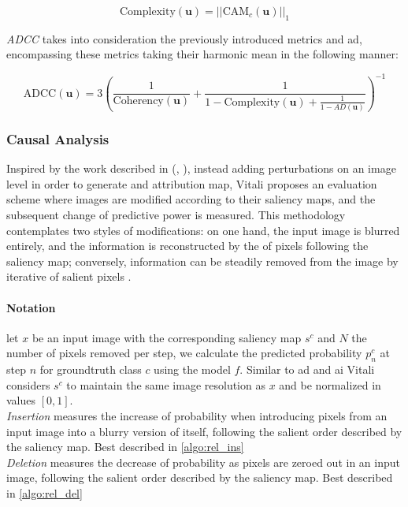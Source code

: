 \begin{equation}
	\mbox{Complexity}(\mathbf{u}) = ||\mbox{CAM}_c(\mathbf{u})||_1
\end{equation}

\noindent \emph{ADCC} takes into consideration the previously introduced metrics and 
\gls{ad}, encompassing these metrics taking their harmonic mean in the following manner:

\begin{equation}
	\mbox{ADCC}(\mathbf{u}) = 3\left(\frac{1}{\mbox{Coherency}(\mathbf{u})} + 
	                           \frac{1}{1-\mbox{Complexity}(\mathbf{u}) + 
							   \frac{1}{1-AD(\mathbf{u})}}\right)^{-1}
\end{equation}
\subsubsection{Causal Analysis} 
\label{sec:causal_metrics}
Inspired by the work described in (\cite{fong2017interpretable}, \cite{fong2019understanding}), 
instead adding perturbations on an image level in order to generate 
and attribution map, Vitali proposes an evaluation scheme where images are modified 
according to their saliency maps, and the subsequent change of predictive power is measured. This 
methodology contemplates two styles of modifications: on one hand, the input image is blurred 
entirely, and the information is reconstructed by the  of pixels following the 
saliency map; conversely, information can be steadily removed from the image by iterative
 of salient pixels \autocite{petsiuk2018rise}.\\

\paragraph{Notation} let $x$ be an input image with the corresponding saliency map $s^c$ and $N$ the 
number of pixels removed per step, we calculate the predicted probability $p^c_n$ at step $n$ for 
groundtruth class $c$ using the model $f$.  Similar to \gls{ad} and \gls{ai} Vitali 
considers $s^c$ to maintain the same image resolution as $x$ and be normalized in values $[0,1]$.\\

\noindent \emph{Insertion} measures the increase of probability when introducing pixels from an 
input image into a blurry version of itself, following the salient order described by the saliency 
map. Best described in \autoref{algo:rel_ins}\\

\noindent \emph{Deletion} measures the decrease of probability as pixels are zeroed out in an input 
image, following the salient order described by the saliency map. Best 
described in \autoref{algo:rel_del}\\

